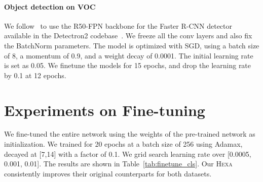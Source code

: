 \documentclass[10pt,twocolumn,letterpaper]{article}
\newcommand{\shortname}{\textsc{Hexa}}
\begin{document}
\paragraph{Object detection on VOC} We follow~\cite{chen2020improved} to use the R50-FPN backbone for the Faster R-CNN detector available in the Detectron2 codebase~\cite{wu2019detectron2}. We freeze all the conv layers and also fix the BatchNorm parameters. The model is optimized with SGD, using a batch size of 8, a momentum of 0.9, and a weight decay of 0.0001. The initial learning rate is set as 0.05. We finetune the models for 15 epochs, and drop the learning rate by 0.1 at 12 epochs.

\section{Experiments on Fine-tuning}

We fine-tuned the entire network using the weights of the pre-trained network as
initialization. We trained for 20 epochs at a batch size of 256 using Adamax, decayed at [7,14] with a factor of 0.1. We grid search learning rate over [0.0005, 0.001,  0.01]. The results are shown in Table~\ref{tab:finetune_cls}. Our \shortname{} consistently improves their original counterparts for both datasets.
\end{document}
